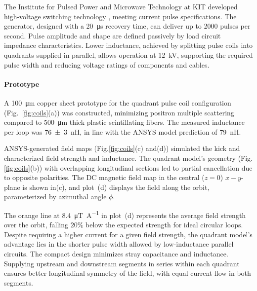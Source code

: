 \begin{refsection}
        The Institute for Pulsed Power and Microwave Technology at KIT developed high-voltage switching technology \cite{GateBoosting}, meeting current pulse specifications. 
        The generator, designed with a \SI{20}{\micro s} recovery time, can deliver up to 2000 pulses per second. 
        Pulse amplitude and shape are defined passively by load circuit impedance characteristics. 
        Lower inductance, achieved by splitting pulse coils into quadrants supplied in parallel, allows operation at \SI{12}{kV}, supporting the required pulse width and reducing voltage ratings of components and cables.

        \paragraph{Prototype}
        A \SI{100}{\micro m} copper sheet prototype for the quadrant pulse coil configuration (Fig.~\ref{fig:coils}(a)) was constructed, minimizing positron multiple scattering compared to \SI{500}{\micro m} thick plastic scintillating fibers. 
        The measured inductance per loop was \SI{76(3)}{nH}, in line with the ANSYS model prediction of \SI{79}{nH}.
        
        ANSYS-generated field maps (Fig.\ref{fig:coils}(c) and(d)) simulated the kick and characterized field strength and inductance. The quadrant model's geometry (Fig.\ref{fig:coils}(b)) with overlapping longitudinal sections led to partial cancellation due to opposite polarities. The DC magnetic field map in the central ($z=0$) $x-y$-plane is shown in(c), and plot~(d) displays the field along the orbit, parameterized by azimuthal angle $\phi$.
        
        The orange line at \SI{8.4}{\micro\tesla\per\ampere} in plot~(d) represents the average field strength over the orbit, falling $20\%$ below the expected strength for ideal circular loops. 
        Despite requiring a higher current for a given field strength, the quadrant model's advantage lies in the shorter pulse width allowed by low-inductance parallel circuits. 
        The compact design minimizes stray capacitance and inductance. 
        Supplying upstream and downstream segments in series within each quadrant ensures better longitudinal symmetry of the field, with equal current flow in both segments.
        

\end{refsection}
